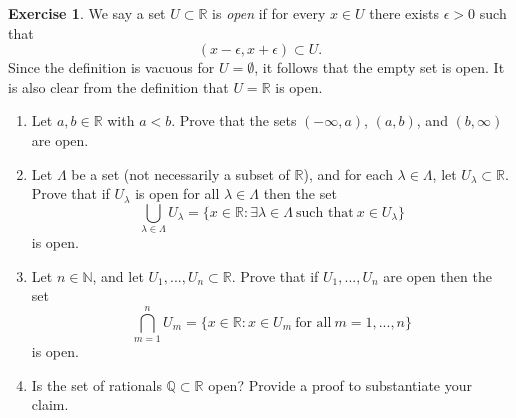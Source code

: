 \documentclass[12pt]{article}
\theoremstyle{definition}
\newtheorem{exercise}{Exercise}
\begin{document}
\begin{exercise}
    We say a set $U \subset \mathbb{R}$ is \textit{open} if for every $x \in U$ there exists $\epsilon > 0$ such that
    \[
        (x - \epsilon, x + \epsilon) \subset U.
    \]
    Since the definition is vacuous for $U = \emptyset$, it follows that the empty set is open. It is also clear from the definition that $U = \mathbb{R}$ is open.
    \begin{enumerate}[label=(\alph*)]
        \item Let $a,b \in \mathbb{R}$ with $a < b$. Prove that the sets $(-\infty,a)$, $(a, b)$, and $(b, \infty)$ are open.
        \item Let $\Lambda$ be a set (not necessarily a subset of $\mathbb{R}$), and for each $\lambda \in \Lambda$, let $U_{\lambda} \subset \mathbb{R}$. Prove that if $U_{\lambda}$ is open for all $\lambda \in \Lambda$ then the set
        \[
            \bigcup_{\lambda \in \Lambda}U_{\lambda} = \{x \in \mathbb{R} : \exists \lambda \in \Lambda \ \text{such that} \ x \in U_{\lambda}\}
        \]
        is open.
        \item Let $n \in \mathbb{N}$, and let $U_1,...,U_n \subset \mathbb{R}$. Prove that if $U_1,...,U_n$ are open then the set
        \[
            \bigcap_{m = 1}^{n}U_m = \{x \in \mathbb{R} : x \in U_m \ \text{for all} \ m = 1,...,n\}
        \]
        is open.
        \item Is the set of rationals $\mathbb{Q} \subset \mathbb{R}$ open? Provide a proof to substantiate your claim.
    \end{enumerate}
\end{exercise}
\end{document}
